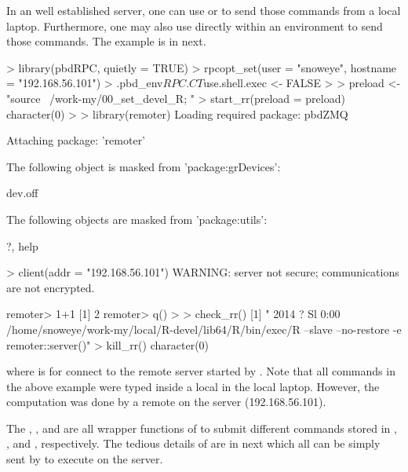 In an well established server, one can use  or 
to send those commands from a local laptop.
Furthermore, one may also use  directly within an 
environment to send those commands. The example is in next.
\begin{Code}[title=Using \pkg{pbdRPC} to control \pkg{remoter}]
> library(pbdRPC, quietly = TRUE)
> rpcopt_set(user = "snoweye", hostname = "192.168.56.101")
> .pbd_env$RPC.CT$use.shell.exec <- FALSE
>
> preload <- "source ~/work-my/00_set_devel_R; "
> start_rr(preload = preload)
character(0)
>
> library(remoter)
Loading required package: pbdZMQ

Attaching package: 'remoter'

The following object is masked from 'package:grDevices':

    dev.off

The following objects are masked from 'package:utils':

    ?, help

> client(addr = "192.168.56.101")
WARNING: server not secure; communications are not encrypted.

remoter> 1+1
[1] 2 
remoter> q()
>
> check_rr()
[1] " 2014 ?        Sl     0:00 /home/snoweye/work-my/local/R-devel/lib64/R/bin/exec/R --slave --no-restore -e remoter::server()"
> kill_rr()
character(0)
\end{Code}
where  is for connect to the remote  server
started by .
Note that all commands in the above example were typed inside a
local  in the local laptop. However, the computation
 was done by a remote  on the server (192.168.56.101).

The , , and  are
all wrapper functions of  to submit different commands stored in
, , and
, respectively.
The tedious details of  are in next which all can be
simply sent by  to execute on the server.

